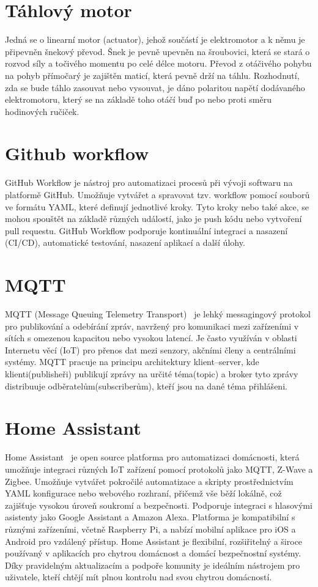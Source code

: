 \section{Táhlový motor}\label{sec:tahlovy-motor}
Jedná se o linearní motor (actuator), jehož součástí je elektromotor a k němu je připevněn šnekový převod.
Šnek je pevně upevněn na šroubovici, která se stará o rozvod síly a točivého momentu po celé délce motoru.
Převod z otáčivého pohybu na pohyb přímočarý je zajištěn maticí, která pevně drží na táhlu.
Rozhodnutí, zda se bude táhlo zasouvat nebo vysouvat, je dáno polaritou napětí dodávaného elektromotoru, který se na základě toho otáčí buď po nebo proti směru hodinových ručiček.

\section{Github workflow}\label{sec:github-workflow}
GitHub Workflow je nástroj pro automatizaci procesů při vývoji softwaru na platformě GitHub.
Umožňuje vytvářet a spravovat tzv. workflow pomocí souborů ve formátu YAML, které definují jednotlivé kroky.
Tyto kroky nebo také akce, se mohou spouštět na základě různých událostí, jako je push kódu nebo vytvoření pull requestu.
GitHub Workflow podporuje kontinuální integraci a nasazení (CI/CD), automatické testování, nasazení aplikací a další úlohy.

\section{MQTT}\label{sec:mqtt}
MQTT (Message Queuing Telemetry Transport)~\cite{HomeAssistantMQTT} je lehký messagingový protokol pro publikování a odebírání zpráv, navržený pro komunikaci mezi zařízeními v sítích s omezenou kapacitou nebo vysokou latencí.
Je často využíván v oblasti Internetu věcí (IoT) pro přenos dat mezi senzory, akčními členy a centrálními systémy.
MQTT pracuje na principu architektury klient–server, kde klienti(publisheři) publikují zprávy na určité téma(topic) a broker tyto zprávy distribuuje odběratelům(subscriberům), kteří jsou na dané téma přihlášeni.

\section{Home Assistant}\label{sec:home-assistant}
Home Assistant~\cite{co-je-to-ha} je open source platforma pro automatizaci domácnosti, která umožňuje integraci různých IoT zařízení pomocí protokolů jako MQTT, Z-Wave a Zigbee.
Umožňuje vytvářet pokročilé automatizace a skripty prostřednictvím YAML konfigurace nebo webového rozhraní, přičemž vše běží lokálně, což zajišťuje vysokou úroveň soukromí a bezpečnosti.
Podporuje integraci s hlasovými asistenty jako Google Assistant a Amazon Alexa.
Platforma je kompatibilní s různými zařízeními, včetně Raspberry Pi, a nabízí mobilní aplikace pro iOS a Android pro vzdálený přístup.
Home Assistant je flexibilní, rozšiřitelný a široce používaný v aplikacích pro chytrou domácnost a domácí bezpečnostní systémy.
Díky pravidelným aktualizacím a podpoře komunity je ideálním nástrojem pro uživatele, kteří chtějí mít plnou kontrolu nad svou chytrou domácností.

